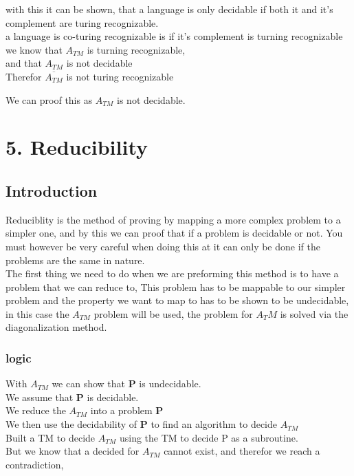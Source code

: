 \documentclass[a4paper,10pt,titlepage]{report}
\begin{document}
with this it can be shown, that a language is only decidable if both it and it's complement are turing recognizable. \\

a language is co-turing recognizable is if it's complement is turning recognizable \\

we know that $A_{TM}$ is turning recognizable,\\
and that $A_{TM}$ is not decidable\\

Therefor $\overline{A_{TM}}$ is not turing recognizable

We can proof this as $A_{TM}$ is not decidable.
 
\newpage
\section{5. Reducibility}

\subsection{Introduction}

Reduciblity is the method of proving by mapping a more complex problem to a simpler one, and by this we can proof that if a problem is decidable or not. You must however be very careful when doing this at it can only be done if the problems are the same in nature.\\
The first thing we need to do when we are preforming this method is to have a problem that we can reduce to, This problem has to be mappable to our simpler problem and the property we want to map to has to be shown to be undecidable, in this case the $A_{TM}$ problem will be used, the problem for $A_TM$ is solved via the diagonalization method.
\subsubsection{logic} 
With $A_{TM}$ we can show that \textbf{P} is undecidable.\\

We assume that \textbf{P} is decidable.\\
We reduce the $ A_{TM} $ into a problem \textbf{P}\\

We then use the decidability of \textbf{P} to find an algorithm to decide $ A_{TM} $\\
Built a TM to decide $A_{TM}$ using the TM to decide P as a subroutine.\\
But we know that a decided for $A_{TM}$ cannot exist, and therefor we reach a contradiction,
\end{document}
